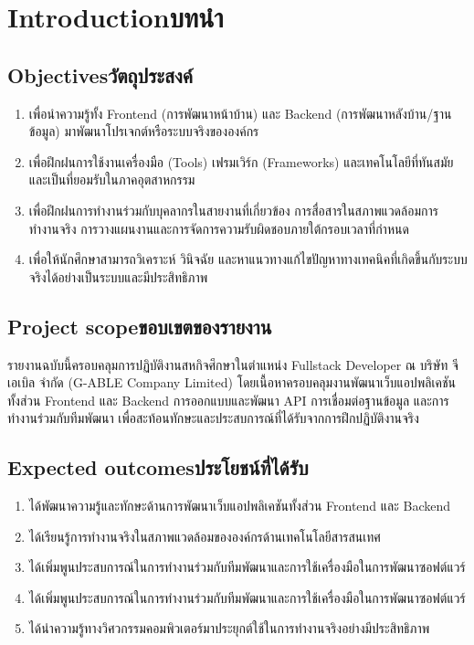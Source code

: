 \chapter{\ifenglish Introduction\else บทนำ\fi}

\section{\ifenglish Objectives\else วัตถุประสงค์\fi}
\begin{enumerate}
    \item เพื่อนำความรู้ทั้ง Frontend (การพัฒนาหน้าบ้าน) และ Backend (การพัฒนาหลังบ้าน/ฐานข้อมูล) มาพัฒนาโปรเจกต์หรือระบบจริงขององค์กร
    \item เพื่อฝึกฝนการใช้งานเครื่องมือ (Tools) เฟรมเวิร์ก (Frameworks) และเทคโนโลยีที่ทันสมัยและเป็นที่ยอมรับในภาคอุตสาหกรรม
    \item เพื่อฝึกฝนการทำงานร่วมกับบุคลากรในสายงานที่เกี่ยวข้อง การสื่อสารในสภาพแวดล้อมการทำงานจริง การวางแผนงานและการจัดการความรับผิดชอบภายใต้กรอบเวลาที่กำหนด
    \item เพื่อให้นักศึกษาสามารถวิเคราะห์ วินิจฉัย และหาแนวทางแก้ไขปัญหาทางเทคนิคที่เกิดขึ้นกับระบบจริงได้อย่างเป็นระบบและมีประสิทธิภาพ
\end{enumerate}

\section{\ifenglish Project scope\else ขอบเขตของรายงาน\fi}
รายงานฉบับนี้ครอบคลุมการปฏิบัติงานสหกิจศึกษาในตำแหน่ง Fullstack Developer ณ บริษัท จีเอเบิล จำกัด (G-ABLE Company Limited) โดยเนื้อหาครอบคลุมงานพัฒนาเว็บแอปพลิเคชันทั้งส่วน Frontend และ Backend การออกแบบและพัฒนา API การเชื่อมต่อฐานข้อมูล และการทำงานร่วมกับทีมพัฒนา เพื่อสะท้อนทักษะและประสบการณ์ที่ได้รับจากการฝึกปฏิบัติงานจริง

\section{\ifenglish Expected outcomes\else ประโยชน์ที่ได้รับ\fi}
\begin{enumerate}
    \item ได้พัฒนาความรู้และทักษะด้านการพัฒนาเว็บแอปพลิเคชันทั้งส่วน Frontend และ Backend
    \item ได้เรียนรู้การทำงานจริงในสภาพแวดล้อมขององค์กรด้านเทคโนโลยีสารสนเทศ
    \item ได้เพิ่มพูนประสบการณ์ในการทำงานร่วมกับทีมพัฒนาและการใช้เครื่องมือในการพัฒนาซอฟต์แวร์
    \item ได้เพิ่มพูนประสบการณ์ในการทำงานร่วมกับทีมพัฒนาและการใช้เครื่องมือในการพัฒนาซอฟต์แวร์
    \item ได้นำความรู้ทางวิศวกรรมคอมพิวเตอร์มาประยุกต์ใช้ในการทำงานจริงอย่างมีประสิทธิภาพ
\end{enumerate}

